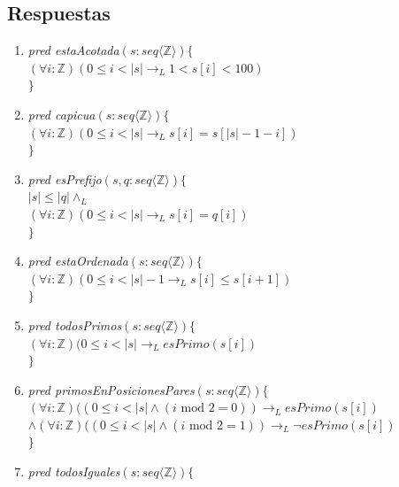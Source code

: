 \documentclass[a4paper]{article}
\begin{document}
\subsection*{Respuestas}

\begin{enumerate}[label=\alph*)]
\item \textit{pred estaAcotada}$(s: seq\langle \mathbb{Z} \rangle)\{$\\
\hspace*{6mm}$(\forall i:\mathbb{Z})(0\leq i<\vert s\vert \rightarrow_L 1<s[i]<100)$\\
$\}$
\item \textit{pred capicua}$(s: seq\langle \mathbb{Z} \rangle)\{$\\
\hspace*{6mm}$(\forall i:\mathbb{Z})(0\leq i<\vert s\vert \rightarrow_L s[i]=s[\vert s\vert-1-i])$\\
$\}$
\item \textit{pred esPrefijo}$(s,q: seq\langle \mathbb{Z} \rangle)\{$\\
\hspace*{6mm}$|s|\leq |q| \wedge_L$\\
\hspace*{6mm}$(\forall i:\mathbb{Z})(0\leq i<\vert s\vert \rightarrow_L s[i]=q[i])$\\
$\}$
\item \textit{pred estaOrdenada}$(s: seq\langle \mathbb{Z} \rangle)\{$\\
\hspace*{6mm}$(\forall i:\mathbb{Z})(0\leq i<\vert s\vert -1\rightarrow_L s[i]\leq s[i+1])$\\
$\}$
\item \textit{pred todosPrimos}$(s: seq\langle \mathbb{Z} \rangle)\{$\\
\hspace*{6mm}$(\forall i:\mathbb{Z})(0\leq i<\vert s\vert\rightarrow_L esPrimo(s[i])$\\
$\}$
\item \textit{pred primosEnPosicionesPares}$(s: seq\langle \mathbb{Z} \rangle)\{$\\
\hspace*{6mm}$(\forall i:\mathbb{Z})((0\leq i<\vert s\vert \wedge (i \textrm{ mod } 2 =0))\rightarrow_L esPrimo(s[i])$\\
$\wedge (\forall i:\mathbb{Z})((0\leq i<\vert s\vert \wedge (i \textrm{ mod }2 =1))\rightarrow_L \neg esPrimo(s[i])$\\
$\}$
\item \textit{pred todosIguales}$(s: seq\langle \mathbb{Z} \rangle)\{$\\

\end{enumerate}
\end{document}
